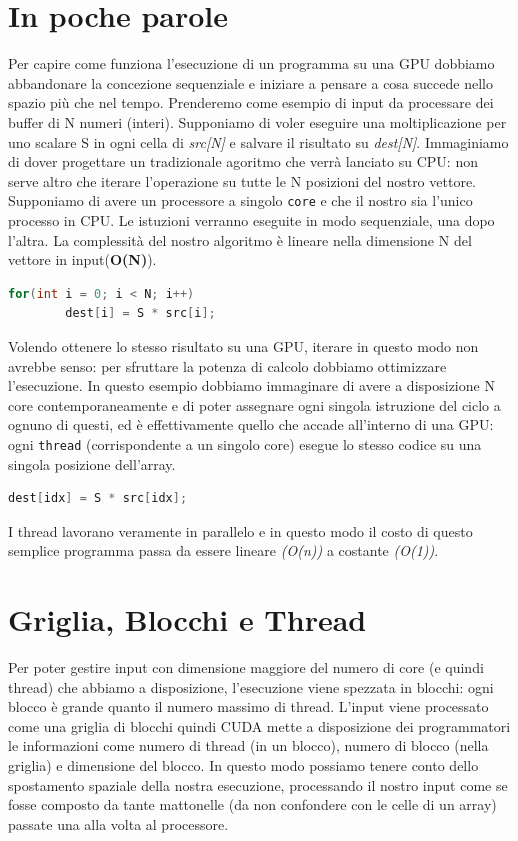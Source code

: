 \documentclass[binding=0.6cm, noexaminfo]{sapthesis}\usepackage{microtype}
\begin{document}
\section{In poche parole}
Per capire come funziona l'esecuzione di un programma su una GPU dobbiamo abbandonare la 
concezione sequenziale e iniziare a pensare a cosa succede nello spazio più che nel tempo. Prenderemo 
come esempio di input da processare dei buffer di N numeri (interi). Supponiamo di voler eseguire 
una moltiplicazione per uno scalare S in ogni cella di \textit{src[N]} e salvare 
il risultato su \textit{dest[N]}. Immaginiamo di dover progettare un tradizionale agoritmo che verrà 
lanciato su CPU: non serve altro
che iterare l'operazione su tutte le N posizioni del nostro vettore.  Supponiamo di avere un processore a singolo \texttt{core} e che il nostro sia l'unico processo in CPU. Le istuzioni verranno eseguite in modo sequenziale, una dopo l'altra. La complessità del nostro algoritmo è lineare nella dimensione N del vettore in input(\textbf{O(N)}).
\begin{lstlisting}[language=C]
    for(int i = 0; i < N; i++)
        dest[i] = S * src[i];
\end{lstlisting}

Volendo ottenere lo stesso risultato su una GPU, iterare in questo modo non avrebbe senso: per sfruttare
la potenza di calcolo dobbiamo ottimizzare l'esecuzione. In questo esempio dobbiamo immaginare di avere a disposizione N core contemporaneamente e di poter assegnare ogni singola istruzione del ciclo a ognuno di questi, ed è effettivamente quello che accade all'interno di una GPU: ogni \texttt{thread} (corrispondente a un singolo core) esegue lo stesso codice su una singola posizione dell'array.
\begin{lstlisting}[language=C]
    dest[idx] = S * src[idx];
\end{lstlisting}
I thread lavorano veramente in parallelo e in questo modo il costo di questo semplice programma passa da essere lineare \textit{(O(n))} a costante \textit{(O(1))}. 
\section{Griglia, Blocchi e Thread}
Per poter gestire input con dimensione maggiore del numero di core (e quindi thread) che abbiamo a disposizione,
l'esecuzione viene spezzata in blocchi: ogni blocco è grande quanto il numero massimo di thread.
L'input viene processato come una griglia di blocchi quindi CUDA mette a disposizione dei programmatori 
le informazioni come numero di thread (in un blocco), numero di blocco (nella griglia) e dimensione 
del blocco. In questo modo possiamo tenere conto dello spostamento spaziale della nostra esecuzione, processando il nostro input come se fosse composto da tante mattonelle (da non confondere con le celle di un array) passate una alla volta al processore.
\end{document}
